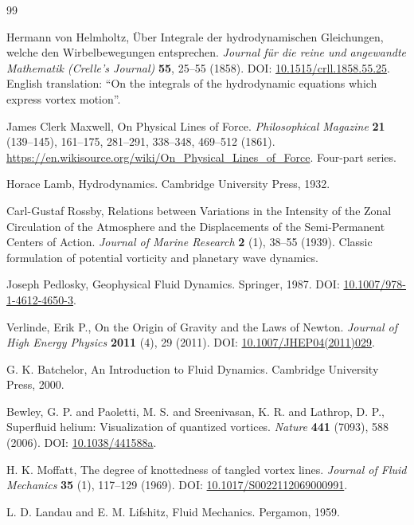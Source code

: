 \documentclass[a4paper,12pt]{article}
\begin{document}
\begin{thebibliography}{99}

Hermann von Helmholtz,
\newblock Über Integrale der hydrodynamischen Gleichungen, welche den Wirbelbewegungen entsprechen.
\textit{Journal für die reine und angewandte Mathematik (Crelle's Journal)} \textbf{55}, 25--55 (1858).
\newblock DOI: \href{https://doi.org/10.1515/crll.1858.55.25}{10.1515/crll.1858.55.25}.
\newblock English translation: ``On the integrals of the hydrodynamic equations which express vortex motion''.


James Clerk Maxwell,
\newblock On Physical Lines of Force.
\textit{Philosophical Magazine} \textbf{21} (139--145), 161--175, 281--291, 338--348, 469--512 (1861).
\newblock \url{https://en.wikisource.org/wiki/On_Physical_Lines_of_Force}.
\newblock Four-part series.


Horace Lamb,
\newblock Hydrodynamics.
\newblock Cambridge University Press, 1932.


Carl-Gustaf Rossby,
\newblock Relations between Variations in the Intensity of the Zonal Circulation of the Atmosphere and the Displacements of the Semi-Permanent Centers of Action.
\textit{Journal of Marine Research} \textbf{2} (1), 38--55 (1939).
\newblock Classic formulation of potential vorticity and planetary wave dynamics.


Joseph Pedlosky,
\newblock Geophysical Fluid Dynamics.
\newblock Springer, 1987.
\newblock DOI: \href{https://doi.org/10.1007/978-1-4612-4650-3}{10.1007/978-1-4612-4650-3}.


Verlinde, Erik P.,
\newblock On the Origin of Gravity and the Laws of Newton.
\textit{Journal of High Energy Physics} \textbf{2011} (4), 29 (2011).
\newblock DOI: \href{https://doi.org/10.1007/JHEP04(2011)029}{10.1007/JHEP04(2011)029}.


G. K. Batchelor,
\newblock An Introduction to Fluid Dynamics.
\newblock Cambridge University Press, 2000.


Bewley, G. P. and Paoletti, M. S. and Sreenivasan, K. R. and Lathrop, D. P.,
\newblock Superfluid helium: Visualization of quantized vortices.
\textit{Nature} \textbf{441} (7093), 588 (2006).
\newblock DOI: \href{https://doi.org/10.1038/441588a}{10.1038/441588a}.


H. K. Moffatt,
\newblock The degree of knottedness of tangled vortex lines.
\textit{Journal of Fluid Mechanics} \textbf{35} (1), 117--129 (1969).
\newblock DOI: \href{https://doi.org/10.1017/S0022112069000991}{10.1017/S0022112069000991}.


L. D. Landau and E. M. Lifshitz,
\newblock Fluid Mechanics.
\newblock Pergamon, 1959.


\end{thebibliography}
\end{document}
